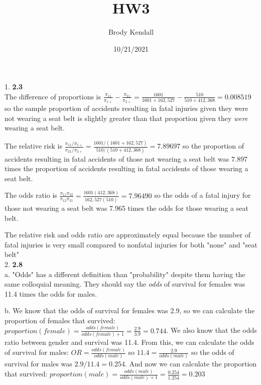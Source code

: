 \documentclass{article}
\title{HW3}
\author{Brody Kendall}
\date{10/21/2021}
\begin{document}
\maketitle

1. \textbf{2.3}\\

The difference of proportions is $\frac{\pi_{11}}{\pi_{1+}} - \frac{\pi_{21}}{\pi_{2+}} = \frac{1601}{1601+162,527} - \frac{510}{510 + 412,368} = 0.008519$ so the sample proportion of accidents resulting in fatal injuries given they were not wearing a seat belt is slightly greater than that proportion given they \textit{were} wearing a seat belt.

The relative risk is $\frac{\pi_{11}/\pi_{1+}}{\pi_{21}/\pi_{2+}} = \frac{1601/(1601+162,527)}{510/(510 + 412,368)} = 7.89697$ so the proportion of accidents resulting in fatal accidents of those not wearing a seat belt was 7.897 times the proportion of accidents resulting in fatal accidents of those wearing a seat belt.

The odds ratio is $\frac{\pi_{11}\pi_{22}}{\pi_{12}\pi_{21}} = \frac{1601(412,368)}{162,527(510)} = 7.96490$ so the odds of a fatal injury for those not wearing a seat belt was 7.965 times the odds for those wearing a seat belt.

The relative risk and odds ratio are approximately equal because the number of fatal injuries is very small compared to nonfatal injuries for both "none" and "seat belt"
\\

2. \textbf{2.8}\\

a. "Odds" has a different definition than "probability" despite them having the same colloquial meaning. They should say the \textit{odds} of survival for females was 11.4 times the odds for males.

b. We know that the odds of survival for females was 2.9, so we can calculate the proportion of females that survived: $proportion(female) = \frac{odds(female)}{odds(female)+1} = \frac{2.9}{3.9} = 0.744$. We also know that the odds ratio between gender and survival was 11.4. From this, we can calculate the odds of survival for males: $OR = \frac{odds(female)}{odds(male)}$ so $11.4 = \frac{2.9}{odds(male)}$ so the odds of survival for males was $2.9/11.4 = 0.254$. And now we can calculate the proportion that survived: $proportion(male) = \frac{odds(male)}{odds(male)+1} = \frac{0.254}{1.254} = 0.203$
\\
\end{document}
